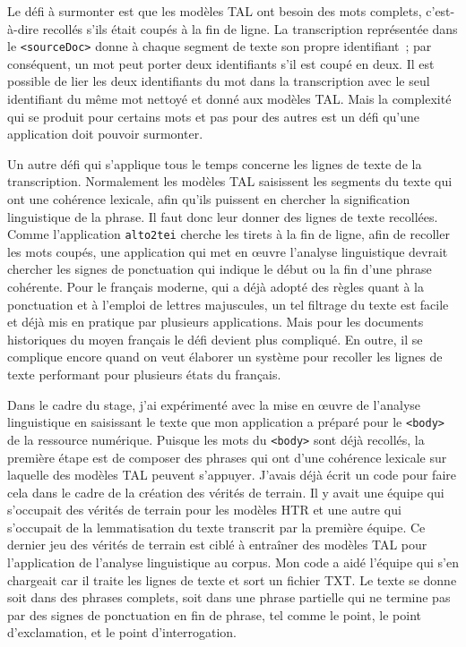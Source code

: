 \documentclass[class=article, crop=false]{standalone}
\begin{document}
Le défi à surmonter est que les modèles \acrshort{TAL} ont besoin des mots complets, c'est-à-dire recollés s'ils était coupés à la fin de ligne. La transcription représentée dans le \texttt{<sourceDoc>} donne à chaque segment de texte son propre identifiant~; par conséquent, un mot peut porter deux identifiants s'il est coupé en deux. Il est possible de lier les deux identifiants du mot dans la transcription avec le seul identifiant du même mot nettoyé et donné aux modèles \acrshort{TAL}. Mais la complexité qui se produit pour certains mots et pas pour des autres est un défi qu'une application doit pouvoir surmonter.

Un autre défi qui s'applique tous le temps concerne les lignes de texte de la transcription. Normalement les modèles \acrshort{TAL} saisissent les segments du texte qui ont une cohérence lexicale, afin qu'ils puissent en chercher la signification linguistique de la phrase. Il faut donc leur donner des lignes de texte recollées. Comme l'application \texttt{alto2tei} cherche les tirets à la fin de ligne, afin de recoller les mots coupés, une application qui met en œuvre l'analyse linguistique devrait chercher les signes de ponctuation qui indique le début ou la fin d'une phrase cohérente. Pour le français moderne, qui a déjà adopté des règles quant à la ponctuation et à l'emploi de lettres majuscules, un tel filtrage du texte est facile et déjà mis en pratique par plusieurs applications. Mais pour les documents historiques du moyen français le défi devient plus compliqué. En outre, il se complique encore quand on veut élaborer un système pour recoller les lignes de texte performant pour plusieurs états du français.

Dans le cadre du stage, j'ai expérimenté avec la mise en œuvre de l'analyse linguistique en saisissant le texte que mon application a préparé pour le \texttt{<body>} de la ressource numérique. Puisque les mots du \texttt{<body>} sont déjà recollés, la première étape est de composer des phrases qui ont d'une cohérence lexicale sur laquelle des modèles \acrshort{TAL} peuvent s'appuyer. J'avais déjà écrit un code pour faire cela dans le cadre de la création des vérités de terrain. Il y avait une équipe qui s'occupait des vérités de terrain pour les modèles \acrshort{HTR} et une autre qui s'occupait de la lemmatisation du texte transcrit par la première équipe. Ce dernier jeu des vérités de terrain est ciblé à entraîner des modèles \acrshort{TAL} pour l'application de l'analyse linguistique au corpus. Mon code a aidé l'équipe qui s'en chargeait car il traite les lignes de texte et sort un fichier TXT. Le texte se donne soit dans des phrases complets, soit dans une phrase partielle qui ne termine pas par des signes de ponctuation en fin de phrase, tel comme le point, le point d'exclamation, et le point d'interrogation.
\end{document}
